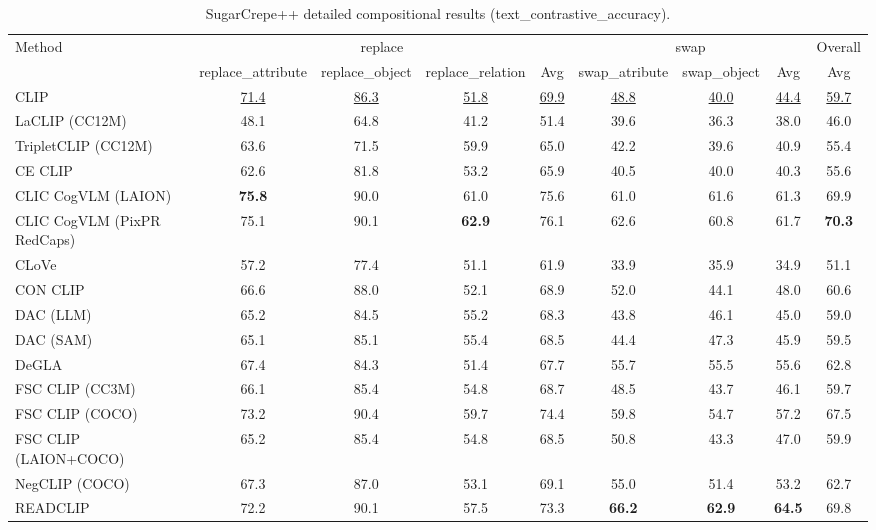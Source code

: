 \begin{table}[t]
  \centering
  \scriptsize
  \caption{SugarCrepe++ detailed compositional results (text_contrastive_accuracy).}
  \label{tab:SugarCrepe++_detailed}
  \begin{adjustbox}{max width=\textwidth}
  \setlength{\tabcolsep}{2pt}
  \begin{tabular}{p{5cm}cccc|ccc|c}
    \toprule
    Method & \multicolumn{4}{c}{replace} & \multicolumn{3}{c}{swap} & Overall \\
     & replace\_attribute & replace\_object & replace\_relation & Avg & swap\_atribute & swap\_object & Avg & Avg \\
    \midrule
    CLIP & \underline{71.4} & \underline{86.3} & \underline{51.8} & \underline{69.9} & \underline{48.8} & \underline{40.0} & \underline{44.4} & \underline{59.7} \\
    \midrule
    LaCLIP (CC12M) & 48.1 & 64.8 & 41.2 & 51.4 & 39.6 & 36.3 & 38.0 & 46.0 \\
    TripletCLIP (CC12M) & 63.6 & 71.5 & 59.9 & 65.0 & 42.2 & 39.6 & 40.9 & 55.4 \\
    \midrule
    CE CLIP & 62.6 & 81.8 & 53.2 & 65.9 & 40.5 & 40.0 & 40.3 & 55.6 \\
    CLIC CogVLM (LAION) & \textbf{75.8} & 90.0 & 61.0 & 75.6 & 61.0 & 61.6 & 61.3 & 69.9 \\
    CLIC CogVLM (PixPR RedCaps) & 75.1 & 90.1 & \textbf{62.9} & 76.1 & 62.6 & 60.8 & 61.7 & \textbf{70.3} \\
    CLoVe & 57.2 & 77.4 & 51.1 & 61.9 & 33.9 & 35.9 & 34.9 & 51.1 \\
    CON CLIP & 66.6 & 88.0 & 52.1 & 68.9 & 52.0 & 44.1 & 48.0 & 60.6 \\
    DAC (LLM) & 65.2 & 84.5 & 55.2 & 68.3 & 43.8 & 46.1 & 45.0 & 59.0 \\
    DAC (SAM) & 65.1 & 85.1 & 55.4 & 68.5 & 44.4 & 47.3 & 45.9 & 59.5 \\
    DeGLA & 67.4 & 84.3 & 51.4 & 67.7 & 55.7 & 55.5 & 55.6 & 62.8 \\
    FSC CLIP (CC3M) & 66.1 & 85.4 & 54.8 & 68.7 & 48.5 & 43.7 & 46.1 & 59.7 \\
    FSC CLIP (COCO) & 73.2 & 90.4 & 59.7 & 74.4 & 59.8 & 54.7 & 57.2 & 67.5 \\
    FSC CLIP (LAION+COCO) & 65.2 & 85.4 & 54.8 & 68.5 & 50.8 & 43.3 & 47.0 & 59.9 \\
    NegCLIP (COCO) & 67.3 & 87.0 & 53.1 & 69.1 & 55.0 & 51.4 & 53.2 & 62.7 \\
    READCLIP & 72.2 & 90.1 & 57.5 & 73.3 & \textbf{66.2} & \textbf{62.9} & \textbf{64.5} & 69.8 \\

\end{tabular}
\end{adjustbox}
\end{table}
